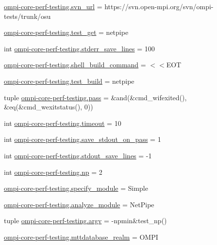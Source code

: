 \begin{DoxyCompactItemize}
\item 
\hyperlink{namespaceompi-core-perf-testing_a886629d41ede129accbc04e99dc7b110}{ompi-\/core-\/perf-\/testing.\-svn\-\_\-url} = https\-://svn.\-open-\/mpi.\-org/svn/ompi-\/tests/trunk/osu
\item 
\hyperlink{namespaceompi-core-perf-testing_a725e3158d8ea5ff2ed5a27ad764902fe}{ompi-\/core-\/perf-\/testing.\-test\-\_\-get} = netpipe
\item 
int \hyperlink{namespaceompi-core-perf-testing_a6be1f4c75e49b8955241e24d4e26ed03}{ompi-\/core-\/perf-\/testing.\-stderr\-\_\-save\-\_\-lines} = 100
\item 
\hyperlink{namespaceompi-core-perf-testing_a0bd18f93397d6a31113bad591de7ada2}{ompi-\/core-\/perf-\/testing.\-shell\-\_\-build\-\_\-command} = $<$$<$E\-O\-T
\item 
\hyperlink{namespaceompi-core-perf-testing_a84f687adcf3641ad705d066e5e141f8f}{ompi-\/core-\/perf-\/testing.\-test\-\_\-build} = netpipe
\item 
tuple \hyperlink{namespaceompi-core-perf-testing_a63aea59e5b483f2e47c3b25d6fb6e162}{ompi-\/core-\/perf-\/testing.\-pass} = \&and(\&cmd\-\_\-wifexited(), \&eq(\&cmd\-\_\-wexitstatus(), 0))
\item 
int \hyperlink{namespaceompi-core-perf-testing_a53171e21f7f78c9829e3273166f9ead7}{ompi-\/core-\/perf-\/testing.\-timeout} = 10
\item 
int \hyperlink{namespaceompi-core-perf-testing_a28f3564fe5f05f94d7a3070664b594b7}{ompi-\/core-\/perf-\/testing.\-save\-\_\-stdout\-\_\-on\-\_\-pass} = 1
\item 
int \hyperlink{namespaceompi-core-perf-testing_aa0d1bbab78860404add1c8f3dd5cd00a}{ompi-\/core-\/perf-\/testing.\-stdout\-\_\-save\-\_\-lines} = -\/1
\item 
int \hyperlink{namespaceompi-core-perf-testing_a8703829fbfbe8a6c19e70d34f880b39e}{ompi-\/core-\/perf-\/testing.\-np} = 2
\item 
\hyperlink{namespaceompi-core-perf-testing_a351d16c6270dff5f1cd7d4c05c279e7d}{ompi-\/core-\/perf-\/testing.\-specify\-\_\-module} = Simple
\item 
\hyperlink{namespaceompi-core-perf-testing_a857540488b9b6bf0c784184a2dbf8a58}{ompi-\/core-\/perf-\/testing.\-analyze\-\_\-module} = Net\-Pipe
\item 
tuple \hyperlink{namespaceompi-core-perf-testing_a78614606eb674f088265f2d238b92074}{ompi-\/core-\/perf-\/testing.\-argv} = -\/npmin\&test\-\_\-np()
\item 
\hyperlink{namespaceompi-core-perf-testing_a70d92258f538bfb8185dc65ef6661317}{ompi-\/core-\/perf-\/testing.\-mttdatabase\-\_\-realm} = O\-M\-P\-I
$$
\end{DoxyCompactItemize}

